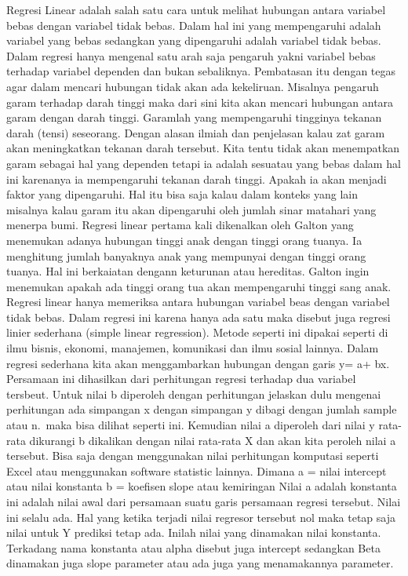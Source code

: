 \documentclass[
]{book}
\theoremstyle{definition}
\theoremstyle{definition}
\theoremstyle{definition}
\theoremstyle{definition}
\theoremstyle{remark}
\begin{document}
Regresi Linear adalah salah satu cara untuk melihat hubungan antara variabel bebas dengan variabel tidak bebas. Dalam hal ini yang mempengaruhi adalah variabel yang bebas sedangkan yang dipengaruhi adalah variabel tidak bebas. Dalam regresi hanya mengenal satu arah saja pengaruh yakni variabel bebas terhadap variabel dependen dan bukan sebaliknya.
Pembatasan itu dengan tegas agar dalam mencari hubungan tidak akan ada kekeliruan. Misalnya pengaruh garam terhadap darah tinggi maka dari sini kita akan mencari hubungan antara garam dengan darah tinggi. Garamlah yang mempengaruhi tingginya tekanan darah (tensi) seseorang. Dengan alasan ilmiah dan penjelasan kalau zat garam akan meningkatkan tekanan darah tersebut. Kita tentu tidak akan menempatkan garam sebagai hal yang dependen tetapi ia adalah sesuatau yang bebas dalam hal ini karenanya ia mempengaruhi tekanan darah tinggi. Apakah ia akan menjadi faktor yang dipengaruhi. Hal itu bisa saja kalau dalam konteks yang lain misalnya kalau garam itu akan dipengaruhi oleh jumlah sinar matahari yang menerpa bumi.
Regresi linear pertama kali dikenalkan oleh Galton yang menemukan adanya hubungan tinggi anak dengan tinggi orang tuanya. Ia menghitung jumlah banyaknya anak yang mempunyai dengan tinggi orang tuanya. Hal ini berkaiatan dengann keturunan atau hereditas. Galton ingin menemukan apakah ada tinggi orang tua akan mempengaruhi tinggi sang anak.\\
Regresi linear hanya memeriksa antara hubungan variabel beas dengan variabel tidak bebas. Dalam regresi ini karena hanya ada satu maka disebut juga regresi linier sederhana (simple linear regression). Metode seperti ini dipakai seperti di ilmu bisnis, ekonomi, manajemen, komunikasi dan ilmu sosial lainnya.
Dalam regresi sederhana kita akan menggambarkan hubungan dengan garis y= a+ bx. Persamaan ini dihasilkan dari perhitungan regresi terhadap dua variabel tersbeut. Untuk nilai b diperoleh dengan perhitungan jelaskan dulu mengenai perhitungan ada simpangan x dengan simpangan y dibagi dengan jumlah sample atau n.~maka bisa dilihat seperti ini. Kemudian nilai a diperoleh dari nilai y rata-rata dikurangi b dikalikan dengan nilai rata-rata X dan akan kita peroleh nilai a tersebut. Bisa saja dengan menggunakan nilai perhitungan komputasi seperti Excel atau menggunakan software statistic lainnya.
Dimana a = nilai intercept atau nilai konstanta
b = koefisen slope atau kemiringan
Nilai a adalah konstanta ini adalah nilai awal dari persamaan suatu garis persamaan regresi tersebut. Nilai ini selalu ada. Hal yang ketika terjadi nilai regresor tersebut nol maka tetap saja nilai untuk Y prediksi tetap ada. Inilah nilai yang dinamakan nilai konstanta. Terkadang nama konstanta atau alpha disebut juga intercept sedangkan Beta dinamakan juga slope parameter atau ada juga yang menamakannya parameter.
\end{document}
